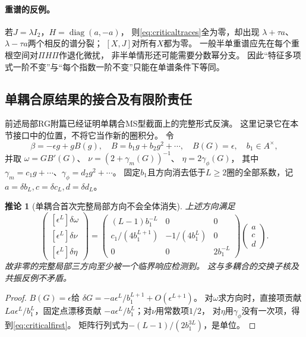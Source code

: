 \documentclass[11pt,a4paper]{ctexart}
\theoremstyle{cnplain}\newtheorem{theorem}{定理}[section]
\newtheorem{corollary}[theorem]{推论}
\theoremstyle{definition}\newtheorem{definition}[theorem]{定义}
\theoremstyle{remark}\newtheorem{remark}[theorem]{注}
\begin{document}
\paragraph{重谱的反例。}
若$J=\lambda I_2$，$H=\operatorname{diag}(a,-a)$，
则\eqref{eq:criticaltraces}全为零，却出现
$\lambda+\tau a$、$\lambda-\tau a$两个相反的谱分裂；
$[X,J]$对所有$X$都为零。
一般半单重谱应先在每个重根空间对$\Pi H\Pi$作退化微扰，
非半单情形还可能需要分数幂分支。
因此“特征多项式一阶不变”与“每个指数一阶不变”只能在单谱条件下等同。

\subsection{单耦合原结果的接合及有限阶责任}

前述局部RG附篇已经证明单耦合MS型截面上的完整形式反演。
这里记录它在本节接口中的位置，不将它当作新的圈积分。
令
\[
 \beta=-\epsilon g+gB(g),\quad B=b_1g+b_2g^2+\cdots,\quad
 B(G)=\epsilon,\quad b_1\in A^\times,
\]
并取
$\omega=GB'(G)$、
$\nu=(2+\gamma_m(G))^{-1}$、
$\eta=2\gamma_\phi(G)$，
其中$\gamma_m=c_1g+\cdots$、$\gamma_\phi=d_2g^2+\cdots$。
固定$b_1$且方向消去低于$L\ge2$圈的全部系数，记
$a=\delta b_L,c=\delta c_L,d=\delta d_L$。

\begin{corollary}[单耦合首次完整局部方向不会全体消失]\label{cor:criticalfirst}
上述方向满足
\[
 \begin{pmatrix}
 [\epsilon^L]\delta\omega\\
 [\epsilon^L]\delta\nu\\
 [\epsilon^L]\delta\eta
 \end{pmatrix}
 =
 \begin{pmatrix}
 (L-1)b_1^{-L}&0&0\\
 c_1/(4b_1^{L+1})&-1/(4b_1^L)&0\\
 0&0&2b_1^{-L}
 \end{pmatrix}
 \begin{pmatrix}a\\c\\d\end{pmatrix}.
 \tag{CF12}\label{eq:criticalfirst}
\]
故非零的完整局部三方向至少被一个临界响应检测到。
这与多耦合的交换子核及共振反例不矛盾。
\end{corollary}
\begin{proof}
$B(G)=\epsilon$给
$\delta G=-a\epsilon^L/b_1^{L+1}+O(\epsilon^{L+1})$。
对$\omega$求方向时，直接项贡献
$La\epsilon^L/b_1^L$，固定点漂移贡献
$-a\epsilon^L/b_1^L$；对$\nu$用常数项$1/2$，
对$\eta$用$\gamma_\phi$没有一次项，得到\eqref{eq:criticalfirst}。
矩阵行列式为$-(L-1)/(2b_1^{3L})$，是单位。
\end{proof}
\end{document}

